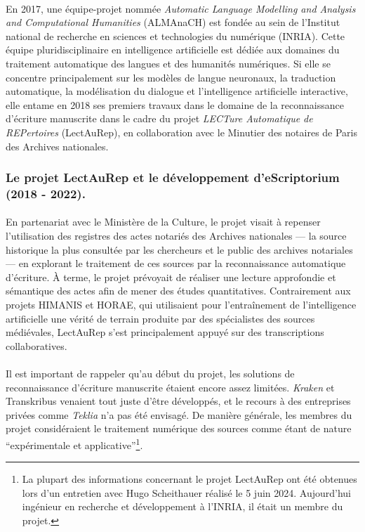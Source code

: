 \documentclass[a4paper,12pt,twoside]{book}
\begin{document}
\paragraph{}
En 2017, une équipe-projet nommée \textit{Automatic Language Modelling and Analysis and Computational Humanities} (ALMAnaCH) est fondée au sein de l’Institut national de recherche en sciences et technologies du numérique (INRIA). Cette équipe pluridisciplinaire en intelligence artificielle est dédiée aux domaines du traitement automatique des langues et des humanités numériques. Si elle se concentre principalement sur les modèles de langue neuronaux, la traduction automatique, la modélisation du dialogue et l'intelligence artificielle interactive, elle entame en 2018 ses premiers travaux dans le domaine de la reconnaissance d’écriture manuscrite dans le cadre du projet \textit{LECTure Automatique de REPertoires} (LectAuRep), en collaboration avec le Minutier des notaires de Paris des Archives nationales.
	
	
	\subsubsection{Le projet LectAuRep et le développement d'eScriptorium (2018 - 2022).}
	
\paragraph{}
En partenariat avec le Ministère de la Culture, le projet visait à repenser l’utilisation des registres des actes notariés des Archives nationales — la source historique la plus consultée par les chercheurs et le public des archives notariales — en explorant le traitement de ces sources par la reconnaissance automatique d’écriture. À terme, le projet prévoyait de réaliser une lecture approfondie et sémantique des actes afin de mener des études quantitatives. Contrairement aux projets HIMANIS et HORAE, qui utilisaient pour l’entraînement de l’intelligence artificielle une vérité de terrain produite par des spécialistes des sources médiévales, LectAuRep s’est principalement appuyé sur des transcriptions collaboratives.

\paragraph{}
Il est important de rappeler qu’au début du projet, les solutions de reconnaissance d’écriture manuscrite étaient encore assez limitées. \textit{Kraken} et Transkribus venaient tout juste d’être développés, et le recours à des entreprises privées comme \textit{Teklia} n’a pas été envisagé. De manière générale, les membres du projet considéraient le traitement numérique des sources comme étant de nature \enquote{expérimentale et applicative}\footnote{La plupart des informations concernant le projet LectAuRep ont été obtenues lors d'un entretien avec Hugo Scheithauer réalisé le 5 juin 2024. Aujourd'hui ingénieur en recherche et développement à l'INRIA, il était un membre du projet.}. 
\end{document}
